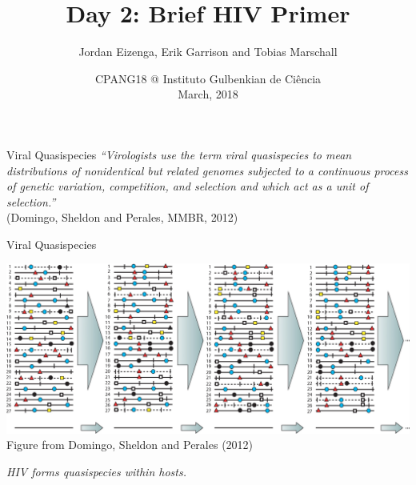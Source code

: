 \documentclass[notes=hide]{beamer}
\title{Day 2: Brief HIV Primer}
\author[TM]{Jordan Eizenga, Erik Garrison and Tobias Marschall}
\date{CPANG18 @ Instituto Gulbenkian de Ci\^{e}ncia\\ March, 2018}
\newcommand{\0}{\ensuremath{\mathtt{0}}}
\newcommand{\1}{\ensuremath{\mathtt{1}}}
\begin{document}
\frame[plain]{\titlepage}



\begin{frame}{Viral Quasispecies}
\textit{``Virologists use the term viral quasispecies to mean distributions of nonidentical but related genomes subjected to a continuous process of genetic variation, competition, and selection and which act as a unit of selection.''}\\
(Domingo, Sheldon and Perales, MMBR, 2012)
\end{frame}

\begin{frame}{Viral Quasispecies}
\begin{center}
\includegraphics[width=\textwidth]{figs/quasispecies-model}\\[.5em]
{\scriptsize Figure from Domingo, Sheldon and Perales (2012)}
\end{center}
\begin{block}{}
\centering \emph{HIV forms quasispecies within hosts.} 
\end{block}
\end{frame}
\end{document}
